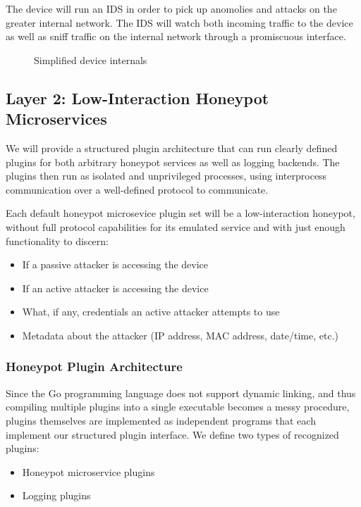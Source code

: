 The device will run an IDS in order to pick up anomolies and attacks on
the greater internal network. The IDS will watch both incoming traffic to
the device as well as sniff traffic on the internal network through a
promiscuous interface.

\begin{figure}
\centering
{

}
\caption{Simplified device internals}
\label{figure:device}
\end{figure}
 

\subsection{Layer 2: Low-Interaction Honeypot Microservices}

We will provide a structured plugin architecture that can run clearly defined
plugins for both arbitrary honeypot services as well as logging backends.
The plugins then run as isolated and unprivileged processes, using interprocess
communication over a well-defined protocol to communicate.

Each default honeypot microsevice plugin set will be a low-interaction
honeypot, without full protocol capabilities for its emulated service and
with just enough functionality to discern:

\begin{itemize}
    \item If a passive attacker is accessing the device
    \item If an active attacker is accessing the device
    \item What, if any, credentials an active attacker attempts to use
    \item Metadata about the attacker (IP address, MAC address, date/time, etc.)
\end{itemize}

\subsubsection{Honeypot Plugin Architecture}

Since the Go programming language does not support dynamic linking,
and thus compiling multiple plugins into a single executable becomes a messy
procedure, plugins themselves are implemented as independent programs
that each implement our structured plugin interface. We define two types of
recognized plugins:
\begin{itemize}
    \item Honeypot microservice plugins
    \item Logging plugins
\end{itemize}

